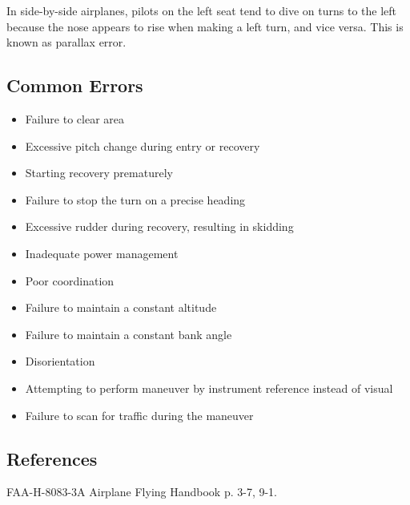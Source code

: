 In side-by-side airplanes, pilots on the left seat tend to dive on turns to the
left because the nose appears to rise when making a left turn, and vice versa.
This is known as parallax error.

\subsection{Common Errors}

\begin{itemize}
  \item Failure to clear area
  \item Excessive pitch change during entry or recovery
  \item Starting recovery prematurely
  \item Failure to stop the turn on a precise heading
  \item Excessive rudder during recovery, resulting in skidding
  \item Inadequate power management
  \item Poor coordination
  \item Failure to maintain a constant altitude
  \item Failure to maintain a constant bank angle
  \item Disorientation
  \item Attempting to perform maneuver by instrument reference instead of
    visual
  \item Failure to scan for traffic during the maneuver
\end{itemize}

\subsection{References}

FAA-H-8083-3A Airplane Flying Handbook p. 3-7, 9-1.

